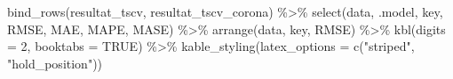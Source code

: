 \documentclass[
  danish,
]{article}
\newenvironment{Shaded}{\begin{snugshade}}{\end{snugshade}}
\newcommand{\AttributeTok}[1]{\textcolor[rgb]{0.40,0.45,0.13}{#1}}
\newcommand{\ConstantTok}[1]{\textcolor[rgb]{0.56,0.35,0.01}{#1}}
\newcommand{\DecValTok}[1]{\textcolor[rgb]{0.68,0.00,0.00}{#1}}
\newcommand{\FunctionTok}[1]{\textcolor[rgb]{0.28,0.35,0.67}{#1}}
\newcommand{\NormalTok}[1]{\textcolor[rgb]{0.00,0.23,0.31}{#1}}
\newcommand{\SpecialCharTok}[1]{\textcolor[rgb]{0.37,0.37,0.37}{#1}}
\newcommand{\StringTok}[1]{\textcolor[rgb]{0.13,0.47,0.30}{#1}}
\begin{document}
\begin{Shaded}
\begin{Highlighting}[]
\FunctionTok{bind\_rows}\NormalTok{(resultat\_tscv, resultat\_tscv\_corona) }\SpecialCharTok{\%\textgreater{}\%}
  \FunctionTok{select}\NormalTok{(data, .model, key, RMSE, MAE, MAPE, MASE) }\SpecialCharTok{\%\textgreater{}\%}
  \FunctionTok{arrange}\NormalTok{(data, key, RMSE) }\SpecialCharTok{\%\textgreater{}\%}
  \FunctionTok{kbl}\NormalTok{(}\AttributeTok{digits =} \DecValTok{2}\NormalTok{, }\AttributeTok{booktabs =} \ConstantTok{TRUE}\NormalTok{) }\SpecialCharTok{\%\textgreater{}\%}
  \FunctionTok{kable\_styling}\NormalTok{(}\AttributeTok{latex\_options =} \FunctionTok{c}\NormalTok{(}\StringTok{"striped"}\NormalTok{, }\StringTok{"hold\_position"}\NormalTok{))}
\end{Highlighting}
\end{Shaded}
\end{document}
